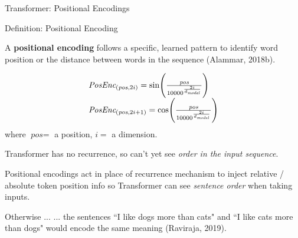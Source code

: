 \begin{frame}{Transformer: Positional Encodings}

    \begin{definitionBlock}{Definition: Positional Encoding}
        \normalsize 
        
        A \textbf{positional encoding} follows a specific, learned pattern to identify word position or the distance between words in the sequence (Alammar, 2018b). 
        
        $$
        \begin{array}{ll}
        \textit{PosEnc}_{\Large (\textit{pos}, 2i)} = \text{sin} \Bigg(\frac {\textit{pos}} {10000^{\Large \frac {2i} {d_{\textit{model}}} } }  \Bigg) \\
        \textit{PosEnc}_{\Large (\textit{pos}, 2i + 1)} = \text{cos} \Bigg(\frac {\textit{pos}} {10000^{\Large \frac {2i} {d_{\textit{model}}} } }  \Bigg)
        \end{array}
        $$
        where $\textit{pos} = $ a position, $i = $ a dimension.
    \end{definitionBlock}
    
    
    
    \begin{itemizeSpaced}{2pt}
        \item Transformer has no recurrence, so can't yet see \emph{order in the input sequence}. 
        
        \item Positional encodings act in place of recurrence mechanism to inject relative / absolute token position info so Transformer can see \emph{sentence order} when taking inputs.
        
        \begin{alertBlock}{Otherwise ...}
        ... the sentences ``I like dogs more than cats" and ``I like cats more than dogs" would encode the same meaning (Raviraja, 2019). 
        \end{alertBlock}
    \end{itemizeSpaced}
    
\end{frame}




